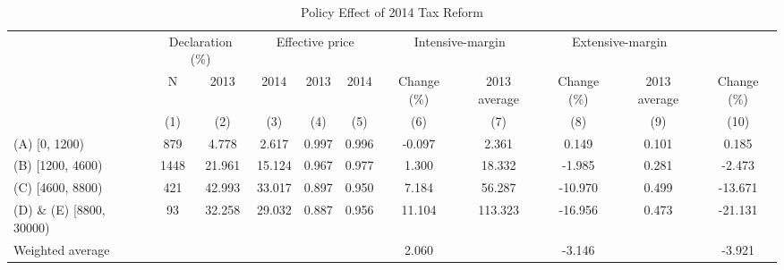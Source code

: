 \begin{table}

\caption{\label{tab:policy-effect}Policy Effect of 2014 Tax Reform}
\centering
\fontsize{7}{9}\selectfont
\begin{threeparttable}
\begin{tabular}[t]{>{\raggedright\arraybackslash}p{10em}cccccccccc}
\toprule
\multicolumn{2}{c}{ } & \multicolumn{2}{c}{Declaration (\%)} & \multicolumn{3}{c}{Effective price} & \multicolumn{2}{c}{Intensive-margin} & \multicolumn{2}{c}{Extensive-margin} \\
\cmidrule(l{3pt}r{3pt}){3-4} \cmidrule(l{3pt}r{3pt}){5-7} \cmidrule(l{3pt}r{3pt}){8-9} \cmidrule(l{3pt}r{3pt}){10-11}
\multicolumn{1}{c}{2013 Income bracket} & \multicolumn{1}{c}{N} & \multicolumn{1}{c}{2013} & \multicolumn{1}{c}{2014} & \multicolumn{1}{c}{2013} & \multicolumn{1}{c}{2014} & \multicolumn{1}{c}{Change (\%)} & \multicolumn{1}{c}{2013 average} & \multicolumn{1}{c}{Change (\%)} & \multicolumn{1}{c}{2013 average} & \multicolumn{1}{c}{Change (\%)} \\
\cmidrule(l{3pt}r{3pt}){1-1} \cmidrule(l{3pt}r{3pt}){2-2} \cmidrule(l{3pt}r{3pt}){3-3} \cmidrule(l{3pt}r{3pt}){4-4} \cmidrule(l{3pt}r{3pt}){5-5} \cmidrule(l{3pt}r{3pt}){6-6} \cmidrule(l{3pt}r{3pt}){7-7} \cmidrule(l{3pt}r{3pt}){8-8} \cmidrule(l{3pt}r{3pt}){9-9} \cmidrule(l{3pt}r{3pt}){10-10} \cmidrule(l{3pt}r{3pt}){11-11}
 & (1) & (2) & (3) & (4) & (5) & (6) & (7) & (8) & (9) & (10)\\
\midrule
(A) [0, 1200) & 879 & 4.778 & 2.617 & 0.997 & 0.996 & -0.097 & 2.361 & 0.149 & 0.101 & 0.185\\
(B) [1200, 4600) & 1448 & 21.961 & 15.124 & 0.967 & 0.977 & 1.300 & 18.332 & -1.985 & 0.281 & -2.473\\
(C) [4600, 8800) & 421 & 42.993 & 33.017 & 0.897 & 0.950 & 7.184 & 56.287 & -10.970 & 0.499 & -13.671\\
(D) \& (E) [8800, 30000) & 93 & 32.258 & 29.032 & 0.887 & 0.956 & 11.104 & 113.323 & -16.956 & 0.473 & -21.131\\
Weighted average &  &  &  &  &  & 2.060 &  & -3.146 &  & -3.921\\
\bottomrule
\end{tabular}
\begin{tablenotes}

\end{tablenotes}
\end{threeparttable}
\end{table}
